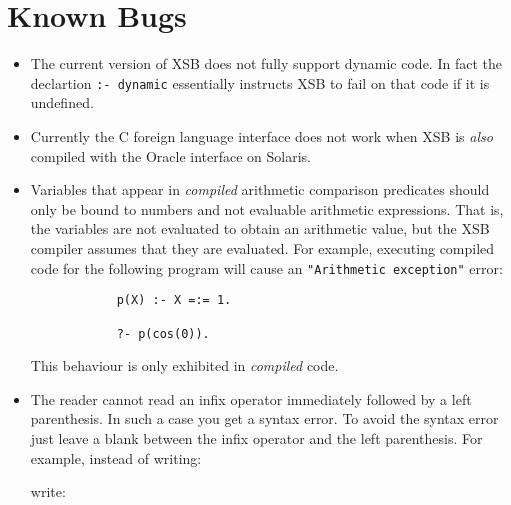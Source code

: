 \section{Known Bugs}

\begin{itemize}
\item The current version of XSB does not fully support dynamic code.
In fact the declartion {\tt :- dynamic} essentially instructs XSB to
fail on that code if it is undefined.
%
\item Currently the C foreign language interface does not work when
      XSB is {\em also} compiled with the Oracle interface on Solaris.
\item Variables that appear in {\em compiled} arithmetic comparison
      predicates should only be bound to numbers and not evaluable
      arithmetic expressions.  That is, the variables are not evaluated
      to obtain an arithmetic value, but the XSB compiler assumes
      that they are evaluated.  For example, executing compiled code for
      the following program will cause an {\tt "Arithmetic exception"}
      error:
      \begin{verbatim}
            p(X) :- X =:= 1.

            ?- p(cos(0)).
      \end{verbatim}
      This behaviour is only exhibited in {\em compiled} code.
\item The reader cannot read an infix operator immediately followed 
      by a left parenthesis.  In such a case you get a syntax error.
      To avoid the syntax error just leave a blank between the infix
      operator and the left parenthesis.  For example, instead of 
      writing:


      \noindent
      write:


\end{itemize}
